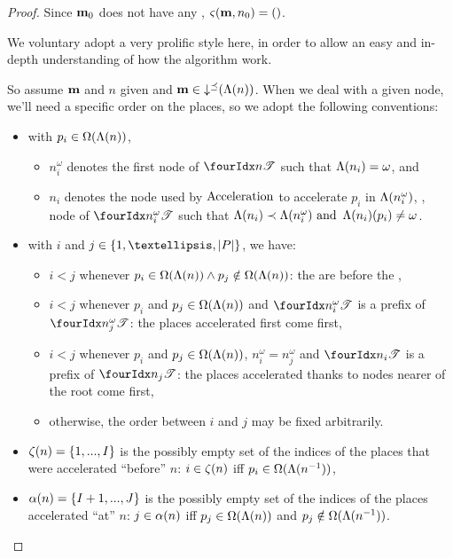 \begin{proof}
  Since $\mathbf{m}_0$ does not have any \oplace, $\operatorname{\varsigma}(\mathbf{m},n_0) = ()$.

  We voluntary adopt a very prolific style here, in order to allow an easy and in-depth understanding of how the algorithm work.

  So assume $\mathbf{m}$ and $n$ given and $\mathbf{m} \in \operatorname{\downarrow^\preceq}(\operatorname{\Lambda}(n))$.
  When we deal with a given node, we'll need a specific order on the places, so we adopt the following conventions:
  \begin{itemize}
    \item with $p_i \in \operatorname{\Omega}(\operatorname{\Lambda}(n))$,
      \begin{itemize}
        \item $n^\omega_i$ denotes the first node of $\treepath{n}$ such that $\operatorname{\Lambda}(n_i) = \omega$, and
        \item $n_i$ denotes the node used by $\operatorname{Acceleration}$ to accelerate $p_i$ in $\operatorname{\Lambda}(n^\omega_i)$, ,  node of $\treepath{n^\omega_i}$ such that $\operatorname{\Lambda}(n_i) \prec \operatorname{\Lambda}(n^\omega_i) \text{ and } \operatorname{\Lambda}(n_i)(p_i) \neq \omega$.
      \end{itemize}
    \item with $i$ and $j \in \{1, …, \card{\places}\}$, we have:
      \begin{itemize}
        \item $i < j$ whenever $p_i \in \operatorname{\Omega}(\operatorname{\Lambda}(n)) \wedge p_j \notin \operatorname{\Omega}(\operatorname{\Lambda}(n))$:
          the \oplaces are before the \noplaces,
        \item $i < j$ whenever $p_i$ and $p_j \in \operatorname{\Omega}(\operatorname{\Lambda}(n))$ and $\treepath{n^\omega_i}$ is a prefix of $\treepath{n^\omega_j}$:
          the places accelerated first come first,
        \item $i < j$ whenever $p_i$ and $p_j \in \operatorname{\Omega}(\operatorname{\Lambda}(n))$, $n^\omega_i = n^\omega_j$ and $\treepath{n_i}$ is a prefix of $\treepath{n_j}$:
          the places accelerated thanks to nodes nearer of the root come first,
        \item otherwise, the order between $i$ and $j$ may be fixed arbitrarily.
      \end{itemize}
    \item $\operatorname{\zeta}(n) = \{1, ..., I\}$ is the possibly empty set of the indices of the places that were accelerated ``before'' $n$: $i \in \operatorname{\zeta}(n)$ iff $p_i \in \operatorname{\Omega}(\operatorname{\Lambda}(n^{-1}))$,
    \item $\operatorname{\alpha}(n) = \{I+1, ..., J\}$ is the possibly empty set of the indices of the places accelerated ``at'' $n$: $j \in \operatorname{\alpha}(n)$ iff $p_j \in \operatorname{\Omega}(\operatorname{\Lambda}(n))$ and $p_j \notin \operatorname{\Omega}(\operatorname{\Lambda}(n^{-1}))$.
  \end{itemize}


\end{proof}
